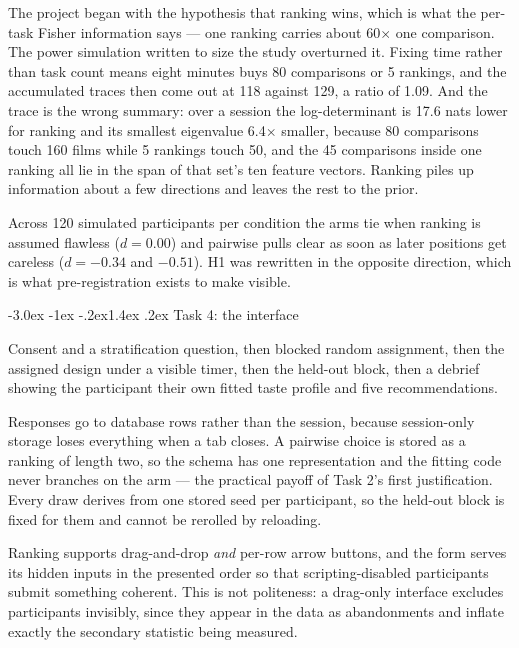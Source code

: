 \documentclass[11pt,a4paper]{article}
\makeatletter
\renewcommand\subsection{\@startsection{subsection}{2}{\z@}%
  {-3.0ex \@plus -1ex \@minus -.2ex}{1.4ex \@plus .2ex}%
  {\normalfont\large\sffamily\bfseries\color{accent}}}
\makeatother
\begin{document}
The project began with the hypothesis that ranking wins, which is what the
per-task Fisher information says --- one ranking carries about 60$\times$ one
comparison. The power simulation written to size the study overturned it. Fixing
time rather than task count means eight minutes buys 80 comparisons or 5 rankings,
and the accumulated traces then come out at 118 against 129, a ratio of 1.09. And
the trace is the wrong summary: over a session the log-determinant is 17.6 nats
lower for ranking and its smallest eigenvalue 6.4$\times$ smaller, because 80
comparisons touch 160 films while 5 rankings touch 50, and the 45 comparisons
inside one ranking all lie in the span of that set's ten feature vectors. Ranking
piles up information about a few directions and leaves the rest to the prior.

Across 120 simulated participants per condition the arms tie when ranking is
assumed flawless ($d = 0.00$) and pairwise pulls clear as soon as later positions
get careless ($d = -0.34$ and $-0.51$). H1 was rewritten in the opposite
direction, which is what pre-registration exists to make visible.

\subsection{Task 4: the interface}

Consent and a stratification question, then blocked random assignment, then the
assigned design under a visible timer, then the held-out block, then a debrief
showing the participant their own fitted taste profile and five recommendations.

Responses go to database rows rather than the session, because session-only
storage loses everything when a tab closes. A pairwise choice is stored as a
ranking of length two, so the schema has one representation and the fitting code
never branches on the arm --- the practical payoff of Task 2's first
justification. Every draw derives from one stored seed per participant, so the
held-out block is fixed for them and cannot be rerolled by reloading.

Ranking supports drag-and-drop \emph{and} per-row arrow buttons, and the form
serves its hidden inputs in the presented order so that scripting-disabled
participants submit something coherent. This is not politeness: a drag-only
interface excludes participants invisibly, since they appear in the data as
abandonments and inflate exactly the secondary statistic being measured.
\end{document}
